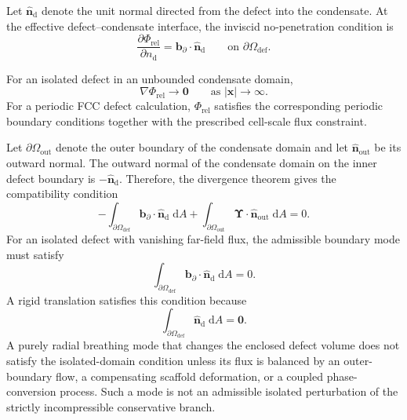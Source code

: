 Let \(\hat{\mathbf n}_{\mathrm d}\) denote the unit normal directed from the defect into the condensate. At the effective defect--condensate interface, the inviscid no-penetration condition is
\begin{equation}
    \frac{\partial\Phi_{\mathrm{rel}}}{\partial n_{\mathrm d}}
    =
    \mathbf b_{\partial}\cdot\hat{\mathbf n}_{\mathrm d}
    \qquad
    \text{on }\partial\Omega_{\mathrm{def}}.
\end{equation}

For an isolated defect in an unbounded condensate domain,
\begin{equation}
    \nabla\Phi_{\mathrm{rel}}\rightarrow\mathbf0
    \qquad
    \text{as }|\mathbf x|\rightarrow\infty.
\end{equation}
For a periodic FCC defect calculation, \(\Phi_{\mathrm{rel}}\) satisfies the corresponding periodic boundary conditions together with the prescribed cell-scale flux constraint.

Let \(\partial\Omega_{\mathrm{out}}\) denote the outer boundary of the condensate domain and let \(\hat{\mathbf n}_{\mathrm{out}}\) be its outward normal. The outward normal of the condensate domain on the inner defect boundary is \(-\hat{\mathbf n}_{\mathrm d}\). Therefore, the divergence theorem gives the compatibility condition
\begin{equation}
    -
    \int_{\partial\Omega_{\mathrm{def}}}
    \mathbf b_{\partial}\cdot\hat{\mathbf n}_{\mathrm d}
    \;\mathrm dA
    +
    \int_{\partial\Omega_{\mathrm{out}}}
    \boldsymbol\Upsilon\cdot\hat{\mathbf n}_{\mathrm{out}}
    \;\mathrm dA
    =0.
\end{equation}
For an isolated defect with vanishing far-field flux, the admissible boundary mode must satisfy
\begin{equation}
    \boxed{
    \int_{\partial\Omega_{\mathrm{def}}}
    \mathbf b_{\partial}\cdot\hat{\mathbf n}_{\mathrm d}
    \;\mathrm dA
    =0 }.
\end{equation}
A rigid translation satisfies this condition because
\begin{equation}
    \int_{\partial\Omega_{\mathrm{def}}}
    \hat{\mathbf n}_{\mathrm d}
    \;\mathrm dA
    =\mathbf0.
\end{equation}
A purely radial breathing mode that changes the enclosed defect volume does not satisfy the isolated-domain condition unless its flux is balanced by an outer-boundary flow, a compensating scaffold deformation, or a coupled phase-conversion process. Such a mode is not an admissible isolated perturbation of the strictly incompressible conservative branch.

